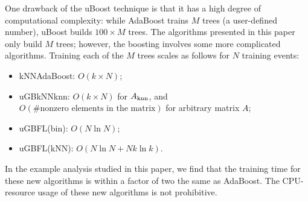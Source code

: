 One drawback of the uBoost technique is that it has a high degree of computational complexity: 
while AdaBoost trains $M$ trees (a user-defined number), uBoost builds $100 \times M$ trees.  
The algorithms presented in this paper only build $M$ trees; however, the boosting involves some more complicated algorithms.  Training each of the $M$ trees scales as follows for $N$ training events:
\begin{itemize}
       \item kNNAdaBoost: $O(k \times N)$;
	\item uGBkNNknn: $O(k \times N)$ for $A_{\rm knn}$, and  
	$O( \text{\#nonzero elements in the matrix})$ for arbitrary matrix $A$;
	\item uGBFL(bin): $O(N \ln N)$;
	\item uGBFL(kNN): $O(N \ln N + N k \ln k) $.
\end{itemize}
In the example analysis studied in this paper, we find that the training time for these new algorithms is within a factor of two the same as AdaBoost.  The CPU-resource usage of these new algorithms is not prohibitive. 
